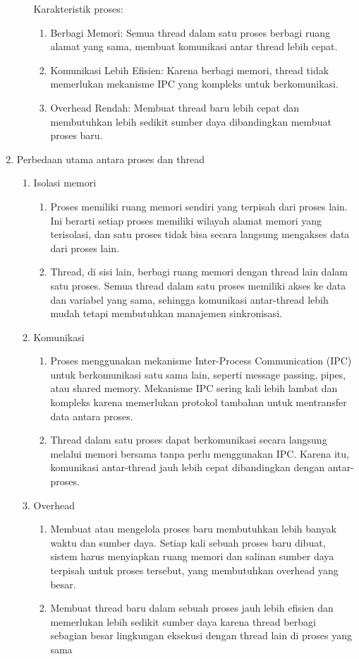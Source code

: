 \documentclass[12pt]{article}
\begin{document}
\begin{enumerate}
\begin{enumerate}
		            Karakteristik proses:
		            \begin{enumerate}
			            \item Berbagi Memori: Semua thread dalam satu proses berbagi ruang alamat yang sama, membuat komunikasi antar thread lebih cepat.
			            \item Komunikasi Lebih Efisien: Karena berbagi memori, thread tidak memerlukan mekanisme IPC yang kompleks untuk berkomunikasi.
			            \item Overhead Rendah: Membuat thread baru lebih cepat dan membutuhkan lebih sedikit sumber daya dibandingkan membuat proses baru.
		            \end{enumerate}
	      \end{enumerate}
	\item Perbedaan utama antara proses dan thread
	      \begin{enumerate}
		      \item Isolasi memori
		            \begin{enumerate}
			            \item Proses memiliki ruang memori sendiri yang terpisah dari proses lain. Ini berarti setiap proses memiliki wilayah alamat memori yang terisolasi, dan satu proses tidak bisa secara langsung mengakses data dari proses lain.
			            \item Thread, di sisi lain, berbagi ruang memori dengan thread lain dalam satu proses. Semua thread dalam satu proses memiliki akses ke data dan variabel yang sama, sehingga komunikasi antar-thread lebih mudah tetapi membutuhkan manajemen sinkronisasi.
		            \end{enumerate}
		      \item Komunikasi
		            \begin{enumerate}
			            \item Proses menggunakan mekanisme Inter-Process Communication (IPC) untuk berkomunikasi satu sama lain, seperti message passing, pipes, atau shared memory. Mekanisme IPC sering kali lebih lambat dan kompleks karena memerlukan protokol tambahan untuk mentransfer data antara proses.
			            \item Thread dalam satu proses dapat berkomunikasi secara langsung melalui memori bersama tanpa perlu menggunakan IPC. Karena itu, komunikasi antar-thread jauh lebih cepat dibandingkan dengan antar-proses.
		            \end{enumerate}
		      \item Overhead
		            \begin{enumerate}
			            \item Membuat atau mengelola proses baru membutuhkan lebih banyak waktu dan sumber daya. Setiap kali sebuah proses baru dibuat, sistem harus menyiapkan ruang memori dan salinan sumber daya terpisah untuk proses tersebut, yang membutuhkan overhead yang besar.
			            \item Membuat thread baru dalam sebuah proses jauh lebih efisien dan memerlukan lebih sedikit sumber daya karena thread berbagi sebagian besar lingkungan eksekusi dengan thread lain di proses yang sama


\end{enumerate}
\end{enumerate}
\end{enumerate}
\end{document}
